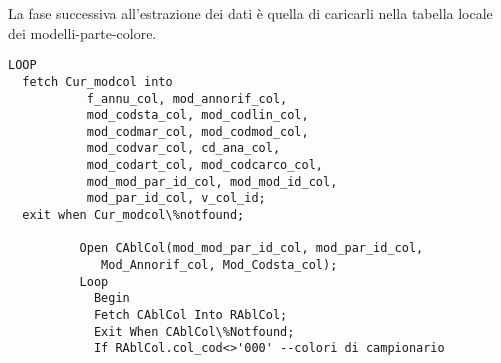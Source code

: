 La fase successiva all'estrazione dei dati è quella di caricarli nella tabella locale dei modelli-parte-colore.
\begin{lstlisting}
LOOP
  fetch Cur_modcol into 
           f_annu_col, mod_annorif_col,
           mod_codsta_col, mod_codlin_col,
           mod_codmar_col, mod_codmod_col,
           mod_codvar_col, cd_ana_col,
           mod_codart_col, mod_codcarco_col,
           mod_mod_par_id_col, mod_mod_id_col,
           mod_par_id_col, v_col_id;
  exit when Cur_modcol\%notfound;
  
          Open CAblCol(mod_mod_par_id_col, mod_par_id_col, 
			 Mod_Annorif_col, Mod_Codsta_col);
          Loop
            Begin
            Fetch CAblCol Into RAblCol;
            Exit When CAblCol\%Notfound;
            If RAblCol.col_cod<>'000' --colori di campionario


\end{lstlisting}
